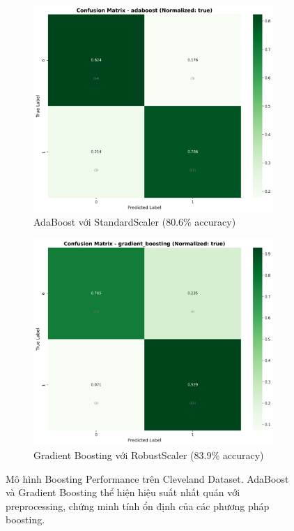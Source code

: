 \begin{figure}[H]
\centering
\begin{subfigure}[b]{0.48\textwidth}
\centering
\includegraphics[width=1\textwidth]{Result/cleveland_dataset/confusion_matrices/adaboost_numeric_dataset_StandardScaler.png}
\caption{AdaBoost với StandardScaler (80.6\% accuracy)}
\label{fig:adaboost_standardscaler_vn}
\end{subfigure}
\hfill
\begin{subfigure}[b]{0.48\textwidth}
\centering
\includegraphics[width=1\textwidth]{Result/cleveland_dataset/confusion_matrices/gradient_boosting_numeric_dataset_RobustScaler.png}
\caption{Gradient Boosting với RobustScaler (83.9\% accuracy)}
\label{fig:gb_robustscaler_all}
\end{subfigure}

\caption{Mô hình Boosting Performance trên Cleveland Dataset. AdaBoost và Gradient Boosting thể hiện hiệu suất nhất quán với preprocessing, chứng minh tính ổn định của các phương pháp boosting.}
\label{fig:boosting_comparison}
\end{figure}

